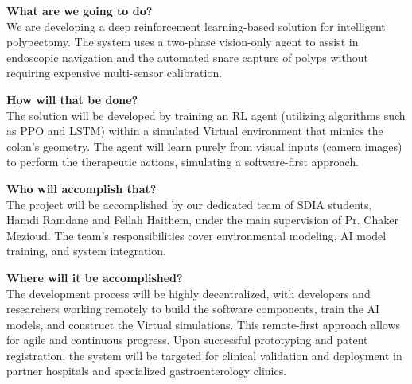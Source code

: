 \vspace{0.2cm}
\textbf{What are we going to do?} \\
We are developing a deep reinforcement learning-based solution for intelligent polypectomy. The system uses a two-phase vision-only agent to assist in endoscopic navigation and the automated snare capture of polyps without requiring expensive multi-sensor calibration.

\vspace{0.2cm}
\textbf{How will that be done?} \\
The solution will be developed by training an RL agent (utilizing algorithms such as PPO and LSTM) within a simulated Virtual environment that mimics the colon's geometry. The agent will learn purely from visual inputs (camera images) to perform the therapeutic actions, simulating a software-first approach.

\vspace{0.2cm}
\textbf{Who will accomplish that?} \\
The project will be accomplished by our dedicated team of SDIA students, Hamdi Ramdane and Fellah Haithem, under the main supervision of Pr. Chaker Mezioud. The team's responsibilities cover environmental modeling, AI model training, and system integration.

\vspace{0.2cm}
\textbf{Where will it be accomplished?} \\
The development process will be highly decentralized, with developers and researchers working remotely to build the software components, train the AI models, and construct the Virtual simulations. This remote-first approach allows for agile and continuous progress. Upon successful prototyping and patent registration, the system will be targeted for clinical validation and deployment in partner hospitals and specialized gastroenterology clinics.

